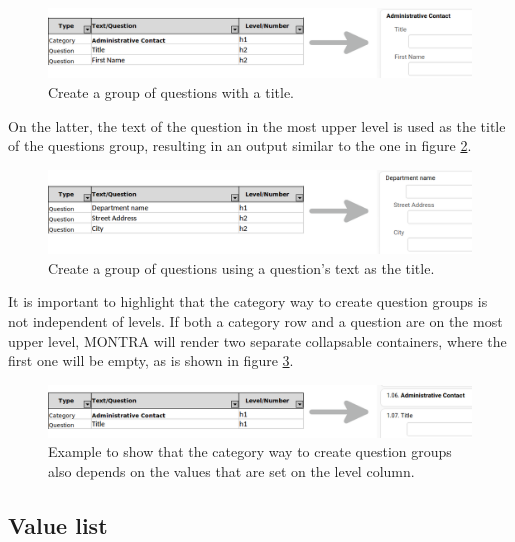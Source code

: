 \begin{figure}[H]
    \center
    \includegraphics[width=\textwidth]{category}
    \caption{Create a group of questions with a title.}
    \label{fig:question-group-category}
\end{figure}

On the latter, the text of the question in the most upper level is used as the title of the questions group, resulting in an output similar to the one in figure \ref{fig:question-group-levels}.

\begin{figure}[H]
    \center
    \includegraphics[width=\textwidth]{levels}
    \caption{Create a group of questions using a question's text as the title.}
    \label{fig:question-group-levels}
\end{figure}

It is important to highlight that the category way to create question groups is not independent of levels.
If both a category row and a question are on the most upper level, MONTRA will render two separate collapsable containers, where the first one will be empty, as is shown in figure \ref{fig:question-group-category-wrong-levels}.

\begin{figure}[H]
    \center
    \includegraphics[width=\textwidth]{category-levels}
    \caption{Example to show that the category way to create question groups also depends on the values that are set on the level column.}
    \label{fig:question-group-category-wrong-levels}
\end{figure}

\subsection*{Value list}

